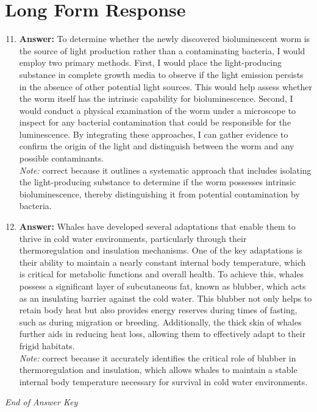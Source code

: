\documentclass[12pt]{article}
\begin{document}
\section*{Long Form Response}
\begin{enumerate}[label=\arabic*.]
\setcounter{enumi}{10}
\item \textbf{Answer:} To determine whether the newly discovered bioluminescent worm is the source of light production rather than a contaminating bacteria, I would employ two primary methods. First, I would place the light-producing substance in complete growth media to observe if the light emission persists in the absence of other potential light sources. This would help assess whether the worm itself has the intrinsic capability for bioluminescence. Second, I would conduct a physical examination of the worm under a microscope to inspect for any bacterial contamination that could be responsible for the luminescence. By integrating these approaches, I can gather evidence to confirm the origin of the light and distinguish between the worm and any possible contaminants.
\\ \textit{Note:} correct because it outlines a systematic approach that includes isolating the light-producing substance to determine if the worm possesses intrinsic bioluminescence, thereby distinguishing it from potential contamination by bacteria.
\item \textbf{Answer:} Whales have developed several adaptations that enable them to thrive in cold water environments, particularly through their thermoregulation and insulation mechanisms. One of the key adaptations is their ability to maintain a nearly constant internal body temperature, which is critical for metabolic functions and overall health. To achieve this, whales possess a significant layer of subcutaneous fat, known as blubber, which acts as an insulating barrier against the cold water. This blubber not only helps to retain body heat but also provides energy reserves during times of fasting, such as during migration or breeding. Additionally, the thick skin of whales further aids in reducing heat loss, allowing them to effectively adapt to their frigid habitats.
\\ \textit{Note:} correct because it accurately identifies the critical role of blubber in thermoregulation and insulation, which allows whales to maintain a stable internal body temperature necessary for survival in cold water environments.
\end{enumerate}

\vfill
\noindent\textit{End of Answer Key}
\end{document}
